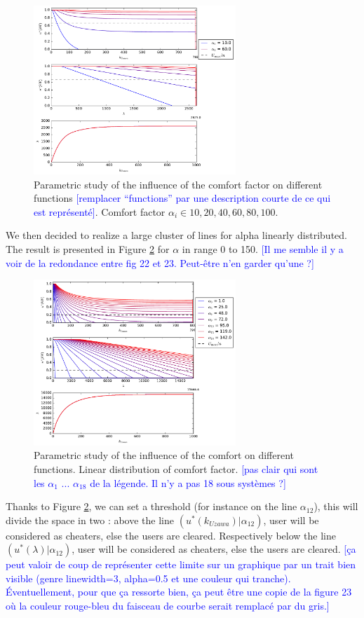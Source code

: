 \documentclass[conference]{IEEEtran}
\newcommand{\rem}[1]{\textcolor{blue}{[#1]}}
\begin{document}
\begin{figure}[!t]
\centering
\includegraphics[width=3in]{KL_10-80.pdf}
\caption{Parametric study of the influence of the comfort factor on different functions \rem{remplacer ``functions'' par une description courte de ce qui est représenté}. Comfort factor $\alpha_i \in {10, 20, 40, 60, 80, 100}$.}
\label{CM_2}
\end{figure}

We then decided to realize a large cluster of lines for alpha linearly distributed. The result is presented in Figure \ref{CM_3} for $\alpha$ in range 0 to 150.
\rem{Il me semble il y a voir de la redondance entre fig 22 et 23. Peut-être n'en garder qu'une ?}

\begin{figure}[!t]
\centering
\includegraphics[width=3in]{KL_lin.pdf}
\caption{Parametric study of the influence of the comfort on different functions. Linear distribution of comfort factor.
\rem{pas clair qui sont les $\alpha_1$ ... $\alpha_{18}$ de la légende. Il n'y a pas 18 sous systèmes ?}}
\label{CM_3}
\end{figure}

Thanks to Figure \ref{CM_3}, we can set a threshold (for instance on the line $\alpha_{12}$), this will divide the space in two : above the line $(u^*(k_{Uzawa}) | \alpha_{12})$, user will be considered as cheaters, else the users are cleared. Respectively below the line $(u^*(\lambda) | \alpha_{12})$, user will be considered as cheaters, else the users are cleared.
\rem{ça peut valoir de coup de représenter cette limite sur un graphique par un trait bien visible (genre linewidth=3, alpha=0.5 et une couleur qui tranche). Éventuellement, pour que ça ressorte bien, ça peut être une copie de la figure 23 où la couleur rouge-bleu du faisceau de courbe serait remplacé par du gris.}
\end{document}

